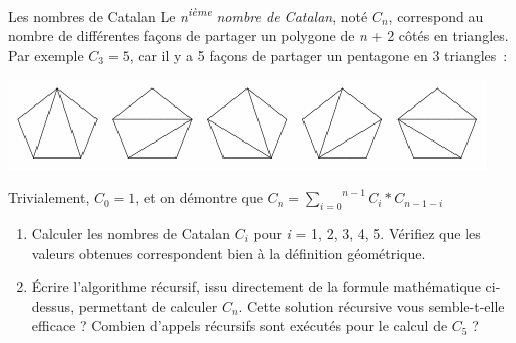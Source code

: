 	\begin{Exercice}{Les nombres de Catalan}
		Le \textit{n\textsuperscript{ième}} \textit{nombre de Catalan}, 
		noté $C_n$, correspond au nombre de différentes façons de 
		partager un polygone de \textit{n} + 2 côtés en triangles. 
		Par exemple $C_3=5$, car il y a 5 façons de partager un 
		pentagone en 3 triangles~:

		\begin{center}
		\includegraphics[width=12.659cm,height=2.387cm]{image/a2012Logique2eme-img027.png}
		\end{center}

		Trivialement, $C_0=1$, et on démontre que 
		$C_n=\overset{n-1}{\underset{i=0}{\sum }}C_i\ast C_{n-1-i}$

		\setcounter{saveenum}{\value{enumi}}
		\begin{enumerate}
			\item {
				Calculer les nombres de Catalan $C_i$ pour \textit{i} = 1, 2, 3, 4, 5. 
				Vérifiez que les valeurs obtenues correspondent bien à la 
				définition géométrique.}
			\item {
				Écrire l'algorithme récursif, issu directement de la formule 
				mathématique ci-dessus, permettant de calculer $C_n$. 
				Cette solution récursive vous semble-t-elle efficace ? 
				Combien d'appels récursifs sont exécutés pour le calcul 
				de $C_5$ ?}
		\end{enumerate}
	\end{Exercice}

